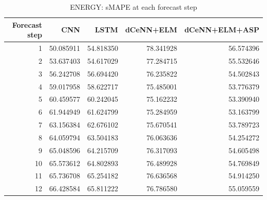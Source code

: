 \begin{table}
\caption{ENERGY: sMAPE at each forecast step}
\begin{tabular}{rrrrr}
\toprule
Forecast step & CNN & LSTM & dCeNN+ELM & dCeNN+ELM+ASP \\
\midrule
1 & 50.085911 & 54.818350 & 78.341928 & 56.574396 \\
2 & 53.637403 & 54.617029 & 77.284715 & 55.532646 \\
3 & 56.242708 & 56.694420 & 76.235822 & 54.502843 \\
4 & 59.017958 & 58.622717 & 75.485001 & 53.776379 \\
5 & 60.459577 & 60.242045 & 75.162232 & 53.390940 \\
6 & 61.944949 & 61.624799 & 75.284959 & 53.163799 \\
7 & 63.156384 & 62.676102 & 75.670541 & 53.789723 \\
8 & 64.059794 & 63.504183 & 76.063636 & 54.254272 \\
9 & 65.048596 & 64.215709 & 76.317093 & 54.605498 \\
10 & 65.573612 & 64.802893 & 76.489928 & 54.769849 \\
11 & 65.736708 & 65.254182 & 76.636568 & 54.914250 \\
12 & 66.428584 & 65.811222 & 76.786580 & 55.059559 \\
\bottomrule
\end{tabular}
\end{table}
